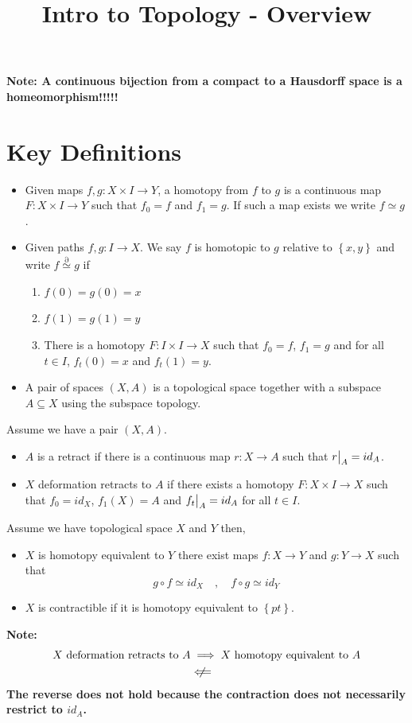 \documentclass[11pt]{article}
\title{Intro to Topology - Overview}
\author{}
\date{}
\newcommand{\homrel}{\stackrel{\partial}{\simeq}}
\newcommand\restr[2]{{%
  \left.\kern-\nulldelimiterspace %
  #1 %
  \vphantom{\big|} %
  \right|_{#2} %
  }}
\newenvironment{defin}
	{\begin{mdframed}[backgroundcolor=white, roundcorner=5pt, linewidth=1pt]
		\setlength{\parindent}{0pt}
		}
	{\end{mdframed}}
\newcommand{\mdf}[1]{{\color{red} #1}}
\newenvironment{note}
	{\begin{mdframed}[backgroundcolor=white, linecolor=red, roundcorner=5pt, linewidth=1pt]\bfseries{Note:}\normalfont}
	{\end{mdframed}}
\begin{document}
\maketitle

\begin{note}
A continuous bijection from a compact to a Hausdorff space is a homeomorphism!!!!!
\end{note}

\section{Key Definitions}
\begin{defin}
\begin{itemize}
	 \item Given maps $f,g:X\times I \to Y$, a \mdf{homotopy} from $f$ to $g$ is a continuous map  $F:X\times I \to Y$ such that $f_0=f$ and $f_1=g$.
		 If such a map exists we write $f\simeq g$.
	 \item Given paths $f,g:I \to X$. We say \mdf{$f$ is homotopic to $g$ relative to $\left\{x, y\right\}$} and write $f\homrel g$ if
		 \begin{enumerate}[label=(\roman*)]
			 \item $f(0)=g(0)=x$
			 \item $f(1)=g(1)=y$
			 \item There is a homotopy $F:I\times I \to X$ such that $f_0=f$, $f_1=g$ and for all $t\in I$, $f_t(0)=x$ and $f_t(1)=y$.
		 \end{enumerate}
	 \item A \mdf{pair} of spaces $(X,A)$ is a topological space together with a subspace $A\subseteq X$ using the subspace topology.
\end{itemize}
Assume we have a pair $(X,A)$.
\begin{itemize}
	 \item $A$ is a \mdf{retract} if there is a continuous map $r:X\to A$ such that $\restr{r}{A}=id_A$.
	 \item $X$ \mdf{deformation retracts} to $A$ if there exists a homotopy $F:X\times I \to X$ such that $f_0=id_X$, $f_1(X)=A$ and $\restr{f_t}{A}=id_A$ for all $t\in I$.
\end{itemize}
Assume we have topological space $X$ and $Y$ then,
\begin{itemize}
	\item $X$ is \mdf{homotopy equivalent} to $Y$ there exist maps $f:X\to Y$ and $g:Y\to X$ such that
	\[
g\circ f \simeq id_X \quad , \quad f\circ g \simeq id_Y
	\]
\item $X$ is \mdf{contractible} if it is homotopy equivalent to $\left\{pt\right\}$.
	
\end{itemize}
\end{defin}
\begin{note}
	\begin{align*}
		X \text{ deformation retracts to } A &\implies X \text{ homotopy equivalent to }A\\
											 &\centernot\Longleftarrow
	\end{align*}
	The reverse does not hold because the contraction does not necessarily restrict to $id_A$.
\end{note}
\end{document}
